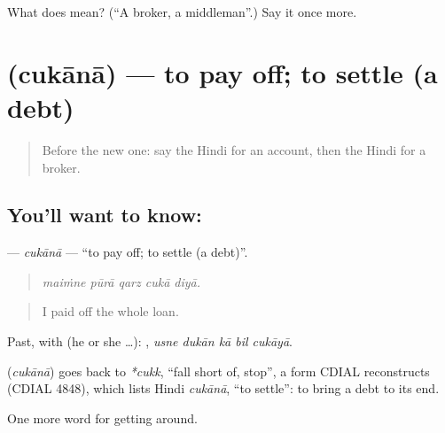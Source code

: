 \begin{tcolorbox}[breakable,colback=teal!4,colframe=teal!35!black,title={Before you move on}]
What does  mean? (\textquotedblleft{}A broker, a middleman\textquotedblright{}.) Say it once more.
\end{tcolorbox}
\section[\texorpdfstring{\hi{चुकाना} (cukānā)}{चुकाना (cukānā)}]{ (cukānā) — to pay off; to settle (a debt)}

\label{lesson:HI-C427-cukana}



\begin{quote}
Before the new one: say the Hindi for an account, then the Hindi for a broker.
\end{quote}

\subsection*{You'll want to know: }
\textbf{} — \emph{cukānā} — \textquotedblleft{}to pay off; to settle (a debt)\textquotedblright{}.

\begin{quote}
    
\end{quote}

\begin{quote}
\emph{maiṁne pūrā qarz cukā diyā.}
\end{quote}

\begin{quote}
I paid off the whole loan.
\end{quote}

Past, with  (he or she …):     , \emph{usne dukān kā bil cukāyā}.

\begin{cousinweb}
\textbf{} (\emph{cukānā}) goes back to \emph{*cukk}, \textquotedblleft{}fall short of, stop\textquotedblright{}, a form CDIAL reconstructs (CDIAL 4848), which lists Hindi \emph{cukānā}, \textquotedblleft{}to settle\textquotedblright{}: to bring a debt to its end.
\end{cousinweb}

\begin{grammarlens}[title={What you've built}]
One more word for getting around.
\end{grammarlens}


